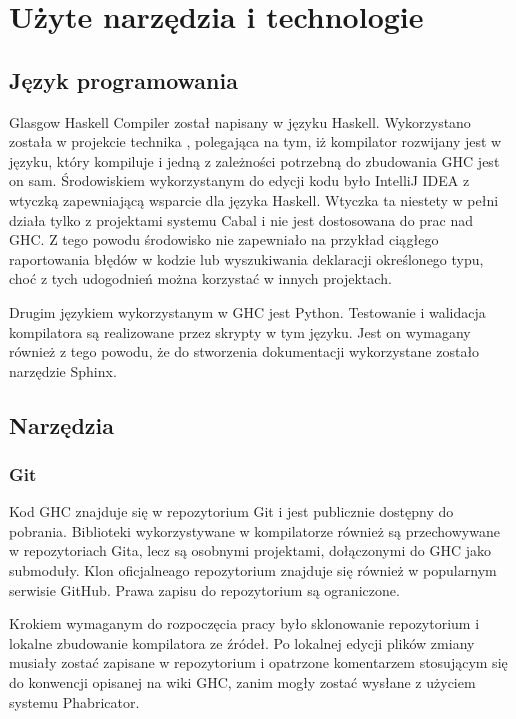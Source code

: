 \chapter{Użyte narzędzia i technologie}\label{chap:technologie}

\section{Język programowania}\label{sec:jezyk_programowania}

Glasgow Haskell Compiler został napisany w języku Haskell. Wykorzystano została w projekcie technika , polegająca na tym, iż kompilator rozwijany jest w języku, który kompiluje i jedną z zależności potrzebną do zbudowania GHC jest on sam. Środowiskiem wykorzystanym do edycji kodu było IntelliJ IDEA z wtyczką zapewniającą wsparcie dla języka Haskell. Wtyczka ta niestety w pełni działa tylko z projektami systemu Cabal i nie jest dostosowana do prac nad GHC. Z tego powodu środowisko nie zapewniało na przykład ciągłego raportowania błędów w kodzie lub wyszukiwania deklaracji określonego typu, choć z tych udogodnień można korzystać w innych projektach.

Drugim językiem wykorzystanym w GHC jest Python. Testowanie i walidacja kompilatora są realizowane przez skrypty w tym języku. Jest on wymagany również z tego powodu, że do stworzenia dokumentacji wykorzystane zostało narzędzie Sphinx.

\section{Narzędzia}

\subsection{Git}

Kod GHC znajduje się w repozytorium Git i jest publicznie dostępny do pobrania. Biblioteki wykorzystywane w kompilatorze również są przechowywane w repozytoriach Gita, lecz są osobnymi projektami, dołączonymi do GHC jako submoduły. Klon oficjalneago repozytorium znajduje się również w popularnym serwisie GitHub. Prawa zapisu do repozytorium są ograniczone\cite{WikiGettingTheSources}.

Krokiem wymaganym do rozpoczęcia pracy było sklonowanie repozytorium i lokalne zbudowanie kompilatora ze źródeł. Po lokalnej edycji plików zmiany musiały zostać zapisane w repozytorium i opatrzone komentarzem stosującym się do konwencji opisanej na wiki GHC, zanim mogły zostać wysłane z użyciem systemu Phabricator.

